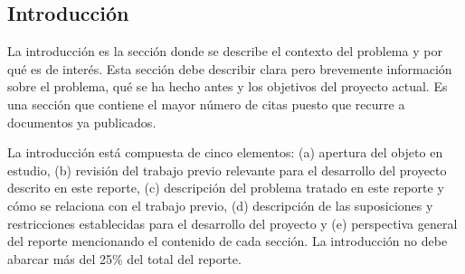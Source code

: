\documentclass{article}
\begin{document}
\fontsize{30}{36}\selectfont
\setlength{\columnsep}{2cm}
\begin{multicols}{3}
\noindent
{}
\section*{Introducción}

\noindent La introducción es la sección donde se describe el contexto del problema y por qué es de interés. Esta sección debe describir clara pero brevemente información sobre el problema, qué se ha hecho antes y los objetivos del proyecto actual. Es una sección que contiene el mayor número de citas puesto que recurre a documentos ya publicados.

La introducción está compuesta de cinco elementos: (a) apertura del objeto en estudio, (b) revisión del trabajo previo relevante para el desarrollo del proyecto descrito en este reporte, (c) descripción del problema tratado en este reporte y cómo se relaciona con el trabajo previo, (d) descripción de las suposiciones y restricciones establecidas para el desarrollo del proyecto y (e) perspectiva general del reporte mencionando el contenido de cada sección. La introducción no debe abarcar más del 25\% del total del reporte.


\end{multicols}
\end{document}
